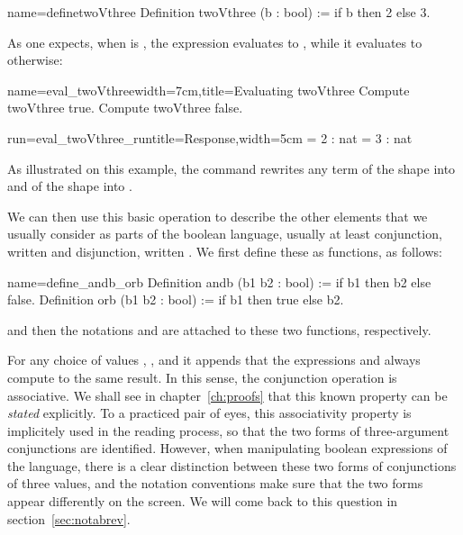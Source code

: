 \begin{coq}{name=definetwoVthree}{}
Definition twoVthree (b : bool) := if b then 2 else 3.
\end{coq}

As one expects, when  is , the expression
 evaluates to , while it evaluates to  otherwise:

\begin{coq-left}{name=eval_twoVthree}{width=7cm,title=Evaluating twoVthree}
Compute twoVthree true.
Compute twoVthree false.
\end{coq-left}
\begin{coqout-right}{run=eval_twoVthree_run}{title=Response,width=5cm}
  = 2 : nat
  = 3 : nat
\end{coqout-right}

As illustrated on this example,
the  command rewrites any term of the shape
 into  and %
of the shape
 into .

We can then use this basic operation to describe the other elements
that we usually consider as parts of the boolean language, usually
at least conjunction, written \C{&&} and disjunction, written \C{||}.
We first define these as functions, as follows:

\begin{coq}{name=define_andb_orb}{}
Definition andb (b1 b2 : bool) := if b1 then b2   else false.
Definition orb  (b1 b2 : bool) := if b1 then true else b2.
\end{coq}
and then the notations \C{&&} and \C{||} are attached to these
two functions, respectively.

For any choice of values , , and  it appends that
the expressions  and  always
compute to the same result.  In this sense, the conjunction operation
is associative.  We shall see in chapter~\ref{ch:proofs} that this
known property can be \emph{stated} explicitly. To a practiced pair of
eyes, this associativity property is implicitely used in the reading
process, so that the two forms of three-argument conjunctions are
identified.
However, when manipulating boolean expressions of the \Coq{} language,
there is a clear distinction between these two forms of conjunctions
of three values, and the notation conventions make sure that the two
forms appear differently on the screen.  We will come back to this
question in section~\ref{sec:notabrev}.

